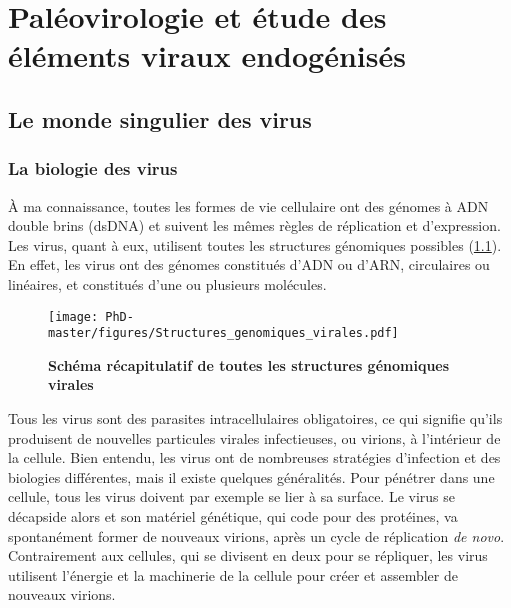 \thispagestyle{empty}
\chapter{Paléovirologie et étude des éléments viraux endogénisés}
{\hypersetup{linkcolor=GREYDARK}\minitoc}
\label{chap:intro-EVES_dEVEs}
\newpage

\section{Le monde singulier des virus}

\subsection{La biologie des virus}

À ma connaissance, toutes les formes de vie cellulaire ont des génomes à ADN double brins (dsDNA) et suivent les mêmes règles de réplication et d'expression. Les virus, quant à eux, utilisent toutes les structures génomiques possibles (\figurename{\ref{figure:Structures_genomiques_virale}}). En effet, les virus ont des génomes constitués d'ADN ou d'ARN, circulaires ou linéaires, et constitués d'une ou plusieurs molécules. 

\begin{figure}[!htpb]
\captionsetup{font=footnotesize}
 \centering
  \texttt{[image: PhD-master/figures/Structures\_genomiques\_virales.pdf]}
\caption[Intro:Schéma récapitulatif de toutes les structures génomiques virales]{\textbf{Schéma récapitulatif de toutes les structures génomiques virales} }
\label{figure:Structures_genomiques_virale}
\end{figure}

Tous les virus sont des parasites intracellulaires obligatoires, ce qui signifie qu'ils produisent de nouvelles particules virales infectieuses, ou virions, à l'intérieur de la cellule. Bien entendu, les virus ont de nombreuses stratégies d'infection et des biologies différentes, mais il existe quelques généralités. Pour pénétrer dans une cellule, tous les virus doivent par exemple se lier à sa surface. Le virus se décapside alors et son matériel génétique, qui code pour des protéines, va spontanément former de nouveaux virions, après un cycle de réplication \textit{de novo}. Contrairement aux cellules, qui se divisent en deux pour se répliquer, les virus utilisent l'énergie et la machinerie de la cellule pour créer et assembler de nouveaux virions.

